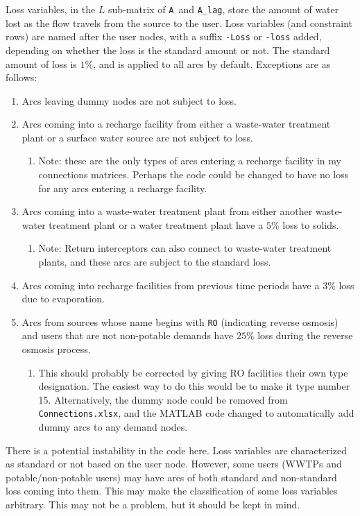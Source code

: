 \documentclass[11pt]{article}
\newcommand{\connections}{\texttt{Connections.xlsx}}
\newcommand{\A}{\texttt{A}}
\newcommand{\Alag}{\texttt{A\_lag}}
\begin{document}
Loss variables, in the $L$ sub-matrix of \A\ and \Alag, store the amount of water lost as the flow travels from the source to the user.
Loss variables (and constraint rows) are named after the user nodes, with a suffix \texttt{-Loss} or \texttt{-loss} added, depending on whether the loss is the standard amount or not.
The standard amount of loss is $1\%$, and is applied to all arcs by default.
Exceptions are as follows:
\begin{enumerate}
	\item Arcs leaving dummy nodes are not subject to loss.
	\item Arcs coming into a recharge facility from either a waste-water treatment plant or a surface water source are not subject to loss.
	\begin{enumerate}
		\item Note: these are the only types of arcs entering a recharge facility in my connections matrices.
				Perhaps the code could be changed to have no loss for any arcs entering a recharge facility.
	\end{enumerate}
	\item Arcs coming into a waste-water treatment plant from either another waste-water treatment plant or a water treatment plant have a $5\%$ loss to solids.
	\begin{enumerate}
		\item Note: Return interceptors can also connect to waste-water treatment plants, and these arcs are subject to the standard loss.
	\end{enumerate}
	\item Arcs coming into recharge facilities from previous time periods have a $3\%$ loss due to evaporation.
	\item Arcs from sources whose name begins with \texttt{RO} (indicating reverse osmosis) and users that are not non-potable demands have $25\%$ loss during the reverse osmosis process.
	\begin{enumerate}
		\item This should probably be corrected by giving RO facilities their own type designation.
			The easiest way to do this would be to make it type number 15.
			Alternatively, the dummy node could be removed from \connections, and the MATLAB code changed to automatically add dummy arcs to any demand nodes.
	\end{enumerate}
\end{enumerate}

There is a potential instability in the code here.
Loss variables are characterized as standard or not based on the user node.
However, some users (WWTPs and potable/non-potable users) may have arcs of both standard and non-standard loss coming into them.
This may make the classification of some loss variables arbitrary.
This may not be a problem, but it should be kept in mind.
\end{document}

